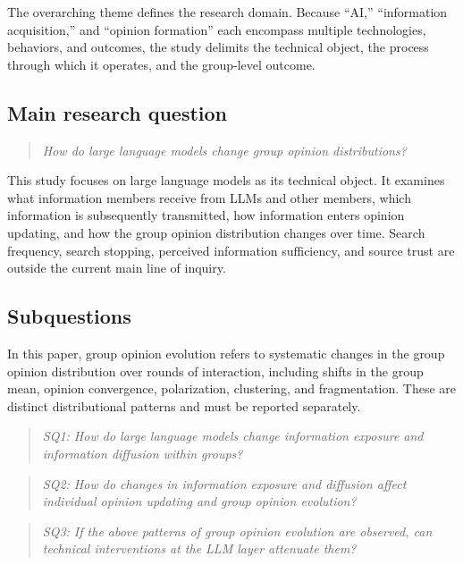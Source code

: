 \documentclass[11pt,a4paper]{article}
\begin{document}
The overarching theme defines the research domain. Because ``AI,'' ``information acquisition,'' and ``opinion formation'' each encompass multiple technologies, behaviors, and outcomes, the study delimits the technical object, the process through which it operates, and the group-level outcome.

\subsection{Main research question}

\begin{quote}\itshape
How do large language models change group opinion distributions?
\end{quote}

This study focuses on large language models as its technical object. It examines what information members receive from LLMs and other members, which information is subsequently transmitted, how information enters opinion updating, and how the group opinion distribution changes over time. Search frequency, search stopping, perceived information sufficiency, and source trust are outside the current main line of inquiry.

\subsection{Subquestions}

In this paper, group opinion evolution refers to systematic changes in the group opinion distribution over rounds of interaction, including shifts in the group mean, opinion convergence, polarization, clustering, and fragmentation. These are distinct distributional patterns and must be reported separately.

\begin{quote}\itshape
SQ1: How do large language models change information exposure and information diffusion within groups?
\end{quote}

\begin{quote}\itshape
SQ2: How do changes in information exposure and diffusion affect individual opinion updating and group opinion evolution?
\end{quote}

\begin{quote}\itshape
SQ3: If the above patterns of group opinion evolution are observed, can technical interventions at the LLM layer attenuate them?
\end{quote}
\end{document}
